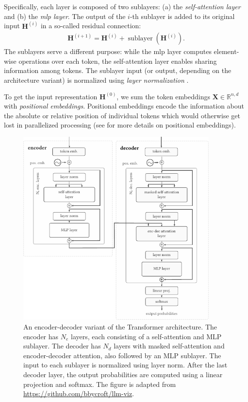 {Specifically, each layer is composed of two sublayers: (a) the \emph{self-attention layer} and (b) the \emph{\ac{mlp} layer}. The output of the $i$-th sublayer is added to its original input $\mathbf{H}^{(i)}$ in a so-called residual connection:
\begin{align}
    \mathbf{H}^{(i+1)} = \mathbf{H}^{(i)} + \operatorname{sublayer}(\mathbf{H}^{(i)}).
\end{align}
The sublayers serve a different purpose: while the \ac{mlp} layer computes element-wise operations over each token, the self-attention layer enables sharing information among tokens. The sublayer input (or output, depending on the architecture variant) is normalized using \emph{layer normalization} \cite{ba2016layer}.

To get the input representation $\mathbf{H}^{(0)}$, we sum the token embeddings $\mathbf{X} \in \mathbb{R}^{n,d}$ with \emph{positional embeddings}. Positional embeddings encode the information about the absolute or relative position of individual tokens which would otherwise get lost in parallelized processing (see \citet{dufter2022position} for more details on positional embeddings).


\begin{figure}[ht]
    \centering
    \includegraphics[width=0.9\textwidth]{img/transformer.pdf}
    \caption{An encoder-decoder variant of the Transformer architecture. The encoder has $N_{e}$ layers, each consisting of a self-attention and MLP sublayer. The decoder has $N_{d}$ layers with masked self-attention and encoder-decoder attention, also followed by an MLP sublayer. The input to each sublayer is normalized using layer norm. After the last decoder layer, the output probabilities are computed using a linear projection and softmax. The figure is adapted from \href{https://github.com/bbycroft/llm-viz/blob/main/src/llm/intro-image.svg}{https://github.com/bbycroft/llm-viz}.}
    \label{fig:transformer}
\end{figure}


}
